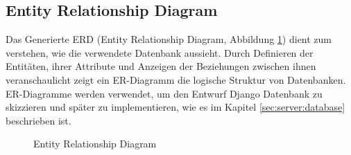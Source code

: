 \subsection{Entity Relationship Diagram}
\label{sec:design:db:erd}
Das Generierte ERD (Entity Relationship Diagram, Abbildung \ref{fig:class}) dient zum verstehen, wie die verwendete Datenbank aussieht. Durch Definieren der Entitäten, ihrer Attribute und Anzeigen der Beziehungen zwischen ihnen veranschaulicht zeigt ein ER-Diagramm die logische Struktur von Datenbanken. ER-Diagramme werden verwendet, um den Entwurf Django Datenbank zu skizzieren und später zu implementieren, wie es im Kapitel \ref{sec:server:database} beschrieben ist. 
\begin{figure}
	\centering
	\caption{Entity Relationship Diagram}
	\label{fig:class}
\end{figure}


